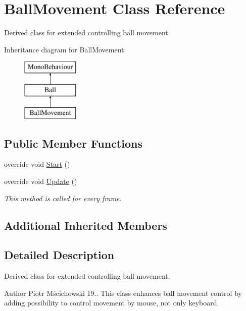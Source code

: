\hypertarget{class_ball_movement}{}\section{Ball\+Movement Class Reference}
\label{class_ball_movement}


Derived class for extended controlling ball movement.  


Inheritance diagram for Ball\+Movement\+:\begin{figure}[H]
\begin{center}
\leavevmode
\includegraphics[height=3.000000cm]{class_ball_movement}
\end{center}
\end{figure}
\subsection*{Public Member Functions}
\begin{DoxyCompactItemize}
\item 
override void \hyperlink{class_ball_movement_a30553c43b5f0edb4ab0b3d1c4b269993}{Start} ()
\item 
override void \hyperlink{class_ball_movement_adec04489bea52562cc6e1e0048c23bc7}{Update} ()
\begin{DoxyCompactList}\small\item\em This method is called for every frame. \end{DoxyCompactList}\end{DoxyCompactItemize}
\subsection*{Additional Inherited Members}


\subsection{Detailed Description}
Derived class for extended controlling ball movement. 

\begin{DoxyAuthor}{Author}
Piotr Mścichowski  19.. This class enhances ball movement control by adding possibility to control movement by mouse, not only keyboard. 
\end{DoxyAuthor}


